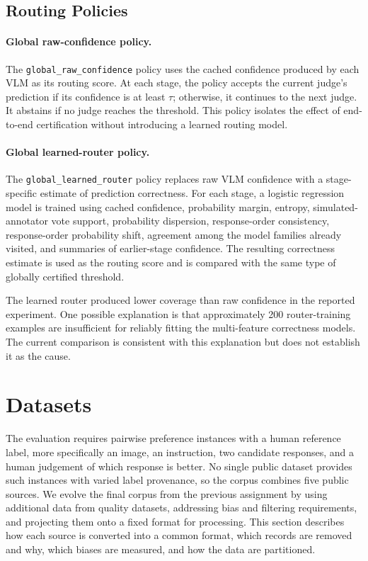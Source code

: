 \documentclass[11pt]{article}
\begin{document}
\subsection{Routing Policies}

\paragraph{Global raw-confidence policy.}
The \texttt{global\_raw\_confidence} policy uses the cached confidence produced by each VLM as its routing score. At each stage, the policy accepts the current judge's prediction if its confidence is at least $\tau$; otherwise, it continues to the next judge. It abstains if no judge reaches the threshold. This policy isolates the effect of end-to-end certification without introducing a learned routing model.

\paragraph{Global learned-router policy.}
The \texttt{global\_learned\_router} policy replaces raw VLM confidence with a stage-specific estimate of prediction correctness. For each stage, a logistic regression model is trained using cached confidence, probability margin, entropy, simulated-annotator vote support, probability dispersion, response-order consistency, response-order probability shift, agreement among the model families already visited, and summaries of earlier-stage confidence. The resulting correctness estimate is used as the routing score and is compared with the same type of globally certified threshold.

The learned router produced lower coverage than raw confidence in the reported experiment. One possible explanation is that approximately 200 router-training examples are insufficient for reliably fitting the multi-feature correctness models. The current comparison is consistent with this explanation but does not establish it as the cause.


\section{Datasets}

The evaluation requires pairwise preference instances with a human reference label, more specifically an image, an instruction, two candidate responses, and a human judgement of which response is better. No single public dataset provides such instances with varied label provenance, so the corpus combines five public sources. We evolve the final corpus from the previous assignment by using additional data from quality datasets, addressing bias and filtering requirements, and projecting them onto a fixed format for processing. This section describes how each source is converted into a common format, which records are removed and why, which biases are measured, and how the data are partitioned.
\end{document}
